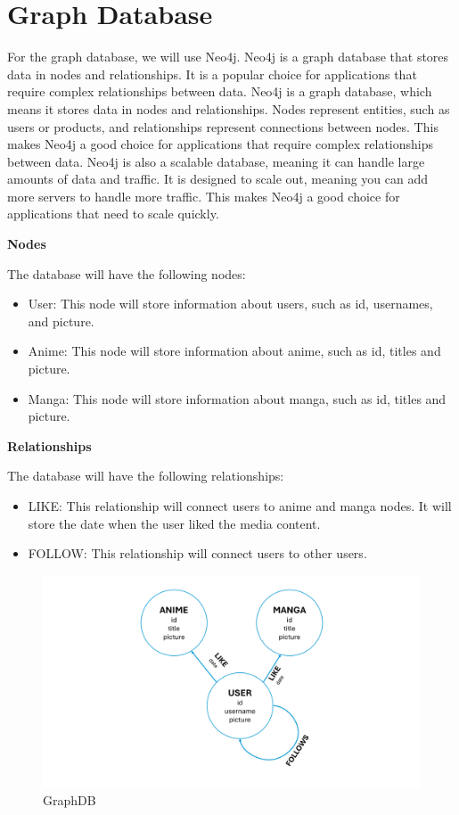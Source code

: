 \newpage
\section{Graph Database}
For the graph database, we will use Neo4j. Neo4j is a graph database that stores data in nodes and relationships. It is a popular choice for applications that require complex relationships between data. Neo4j is a graph database, which means it stores data in nodes and relationships. Nodes represent entities, such as users or products, and relationships represent connections between nodes. This makes Neo4j a good choice for applications that require complex relationships between data. Neo4j is also a scalable database, meaning it can handle large amounts of data and traffic. It is designed to scale out, meaning you can add more servers to handle more traffic. This makes Neo4j a good choice for applications that need to scale quickly.

\textbf{Nodes}

The database will have the following nodes:
\begin{itemize}
    \item User: This node will store information about users, such as id, usernames, and picture.
    \item Anime: This node will store information about anime, such as id, titles and picture.
    \item Manga: This node will store information about manga, such as id, titles and picture.
\end{itemize}

\textbf{Relationships}

The database will have the following relationships:
\begin{itemize}
    \item LIKE: This relationship will connect users to anime and manga nodes. It will store the date when the user liked the media content.
    \item FOLLOW: This relationship will connect users to other users. 
\end{itemize}

\begin{figure}[htbp]
    \centering
    \includegraphics[width=\textwidth]{Media/graph.pdf}
    \caption{GraphDB}
    \label{fig:GraohDB}
\end{figure}

